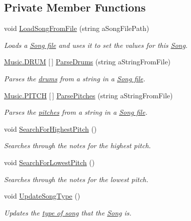 \subsection*{Private Member Functions}
\begin{DoxyCompactItemize}
\item 
void \hyperlink{group___song_priv_func_ga5c8edd8f7ebeab0d93f5619a644c30f5}{Load\+Song\+From\+File} (string a\+Song\+File\+Path)
\begin{DoxyCompactList}\small\item\em Loads a \hyperlink{group___song_group_DocSongFileFormat}{Song file} and uses it to set the values for this \hyperlink{class_song}{Song}. \end{DoxyCompactList}\item 
\hyperlink{group___music_enums_gade475b4382c7066d1af13e7c13c029b6}{Music.\+D\+R\+UM} \mbox{[}$\,$\mbox{]} \hyperlink{group___song_priv_func_gaaa4ca12f0885a34cbfb09bb7a1db178b}{Parse\+Drums} (string a\+String\+From\+File)
\begin{DoxyCompactList}\small\item\em Parses the \hyperlink{group___music_enums_gade475b4382c7066d1af13e7c13c029b6}{drums} from a string in a \hyperlink{group___song_group_DocSongFileFormat}{Song file}. \end{DoxyCompactList}\item 
\hyperlink{group___music_enums_ga508f69b199ea518f935486c990edac1d}{Music.\+P\+I\+T\+CH} \mbox{[}$\,$\mbox{]} \hyperlink{group___song_priv_func_gacf6fee93921e1a5edbc477c0898c357a}{Parse\+Pitches} (string a\+String\+From\+File)
\begin{DoxyCompactList}\small\item\em Parses the \hyperlink{group___music_enums_ga508f69b199ea518f935486c990edac1d}{pitches} from a string in a \hyperlink{group___song_group_DocSongFileFormat}{Song file}. \end{DoxyCompactList}\item 
void \hyperlink{group___song_priv_func_ga5f837e6b7f576732fa38747caa057621}{Search\+For\+Highest\+Pitch} ()
\begin{DoxyCompactList}\small\item\em Searches through the notes for the highest pitch. \end{DoxyCompactList}\item 
void \hyperlink{group___song_priv_func_gac2e812c6385529eb7a9be5082c7bde75}{Search\+For\+Lowest\+Pitch} ()
\begin{DoxyCompactList}\small\item\em Searches through the notes for the lowest pitch. \end{DoxyCompactList}\item 
void \hyperlink{group___song_priv_func_ga9a1d6eba1576c3631d3c0331196d9ae2}{Update\+Song\+Type} ()
\begin{DoxyCompactList}\small\item\em Updates the \hyperlink{group___song_enums_gae681a1f001333e39fc1cb4fea97bfe1b}{type of song} that the \hyperlink{class_song}{Song} is. \end{DoxyCompactList}\end{DoxyCompactItemize}

